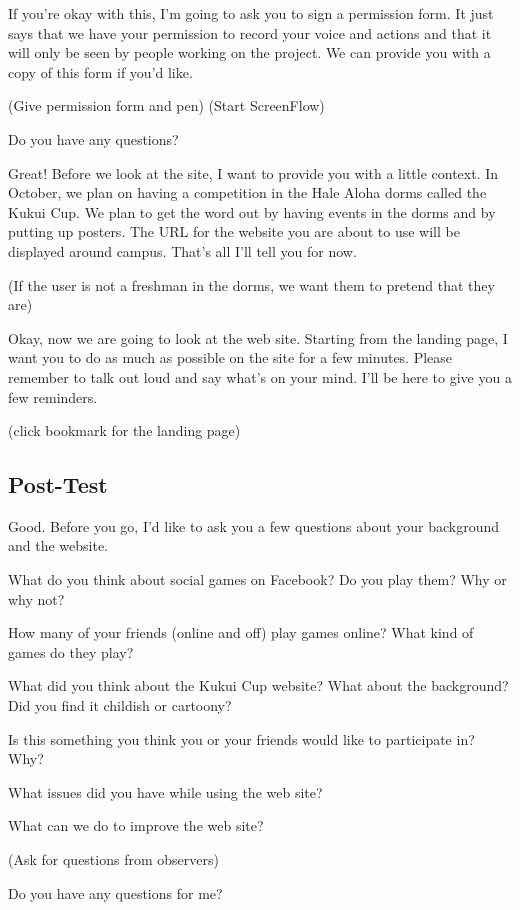 If you're okay with this, I'm going to ask you to sign a permission form.  It just says that we have your permission to record your voice and actions and that it will only be seen by people working on the project.  We can provide you with a copy of this form if you'd like.

(Give permission form and pen)
(Start ScreenFlow)

Do you have any questions?

Great!  Before we look at the site, I want to provide you with a little context. In October, we plan on having a competition in the Hale Aloha dorms called the Kukui Cup.  We plan to get the word out by having events in the dorms and by putting up posters.  The URL for the website you are about to use will be displayed around campus.  That's all I'll tell you for now.

(If the user is not a freshman in the dorms, we want them to pretend that they are)

Okay, now we are going to look at the web site.  Starting from the landing page, I want you to do as much as possible on the site for a few minutes.  Please remember to talk out loud and say what's on your mind.  I'll be here to give you a few reminders.

(click bookmark for the landing page)

\subsection{Post-Test}

Good.  Before you go, I'd like to ask you a few questions about your background and the website.

What do you think about social games on Facebook?  Do you play them?  Why or why not?

How many of your friends (online and off) play games online?  What kind of games do they play?

What did you think about the Kukui Cup website?  What about the background?  Did you find it childish or cartoony?

Is this something you think you or your friends would like to participate in?  Why?

What issues did you have while using the web site?

What can we do to improve the web site?

(Ask for questions from observers)

Do you have any questions for me?

